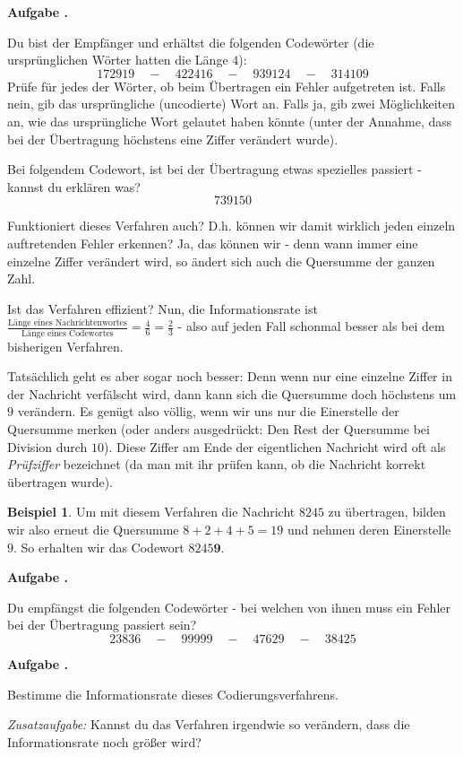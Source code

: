 \documentclass[a4paper,ngerman,12pt]{scrartcl}
\theoremstyle{definition}
\newtheorem{bsp}[defn]{Beispiel}
\theoremstyle{plain}
\theoremstyle{remark}
\newlength{\aufgabenskip}
\newcounter{aufgabennummer}
\newenvironment{aufgabe}[1]{
	\addtocounter{aufgabennummer}{1}
	\textbf{Aufgabe \theaufgabennummer.} \emph{#1} \par
}{\vspace{\aufgabenskip}}
\begin{document}
\begin{aufgabe}{}
	Du bist der Empfänger und erhältst die folgenden Codewörter (die ursprünglichen Wörter hatten die Länge $4$):
		\[172919 \quad-\quad 422416 \quad-\quad 939124  \quad-\quad 314109\]
	Prüfe für jedes der Wörter, ob beim Übertragen ein Fehler aufgetreten ist. Falls nein, gib das ursprüngliche (uncodierte) Wort an. Falls ja, gib zwei Möglichkeiten an, wie das ursprüngliche Wort gelautet haben könnte (unter der Annahme, dass bei der Übertragung höchstens eine Ziffer verändert wurde). 
	
	Bei folgendem Codewort, ist bei der Übertragung etwas spezielles passiert - kannst du erklären was?
		\[739150\]
\end{aufgabe}

Funktioniert dieses Verfahren auch? D.h. können wir damit wirklich jeden einzeln auftretenden Fehler erkennen? Ja, das können wir - denn wann immer eine einzelne Ziffer verändert wird, so ändert sich auch die Quersumme der ganzen Zahl. 

Ist das Verfahren effizient? Nun, die Informationsrate ist $\frac{\text{Länge eines Nachrichtenwortes}}{\text{Länge eines Codewortes}} = \frac{4}{6} = \frac{2}{3}$ - also auf jeden Fall schonmal besser als bei dem bisherigen Verfahren.

Tatsächlich geht es aber sogar noch besser: Denn wenn nur eine einzelne Ziffer in der Nachricht verfälscht wird, dann kann sich die Quersumme doch höchstens um $9$ verändern. Es genügt also völlig, wenn wir uns nur die Einerstelle der Quersumme merken (oder anders ausgedrückt: Den Rest der Quersumme bei Division durch $10$). Diese Ziffer am Ende der eigentlichen Nachricht wird oft als \emph{Prüfziffer} bezeichnet (da man mit ihr prüfen kann, ob die Nachricht korrekt übertragen wurde).

\begin{bsp}
	Um mit diesem Verfahren die Nachricht $8245$ zu übertragen, bilden wir also erneut die Quersumme $8+2+4+5=19$ und nehmen deren Einerstelle $9$. So erhalten wir das Codewort $8245\textbf{9}$.
\end{bsp}

\begin{aufgabe}{}
	Du empfängst die folgenden Codewörter - bei welchen von ihnen muss ein Fehler bei der Übertragung passiert sein?
		\[23836 \quad-\quad 99999 \quad-\quad 47629 \quad-\quad 38425\]
\end{aufgabe}

\begin{aufgabe}{}
	Bestimme die Informationsrate dieses Codierungsverfahrens.

	\emph{Zusatzaufgabe:} Kannst du das Verfahren irgendwie so verändern, dass die Informationsrate noch größer wird?
\end{aufgabe}
\end{document}
